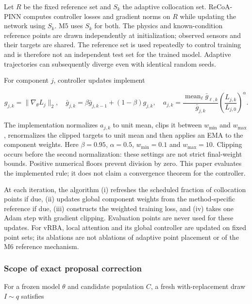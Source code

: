 \documentclass[
  11pt,
]{article}
\begin{document}
Let \(R\) be the fixed reference set and \(S_k\) the adaptive
collocation set. ReCoA-PINN computes controller losses and gradient
norms on \(R\) while updating the network using \(S_k\). M5 uses \(S_k\)
for both. The physics and known-condition reference points are drawn
independently at initialization; observed sensors and their targets are
shared. The reference set is used repeatedly to control training and is
therefore not an independent test set for the trained model. Adaptive
trajectories can subsequently diverge even with identical random seeds.

For component \(j\), controller updates implement

\begin{equation}
g_{j,k}=\|\nabla_\theta L_j\|_2,\quad
\bar g_{j,k}=\beta\bar g_{j,k-1}+(1-\beta)g_{j,k},\quad
a_{j,k}=\frac{\operatorname{mean}_\ell\bar g_{\ell,k}}{\bar g_{j,k}}
\left(\frac{L_{j,k}}{L_{j,0}}\right)^\alpha.
\end{equation}

The implementation normalizes \(a_{j,k}\) to unit mean, clips it between
\(w_{\min}\) and \(w_{\max}\), renormalizes the clipped targets to unit
mean and then applies an EMA to the component weights. Here
\(\beta=0.95\), \(\alpha=0.5\), \(w_{\min}=0.1\) and \(w_{\max}=10\).
Clipping occurs before the second normalization: these settings are not
strict final-weight bounds. Positive numerical floors prevent division
by zero. This paper evaluates the implemented rule; it does not claim a
convergence theorem for the controller.

At each iteration, the algorithm (i) refreshes the scheduled fraction of
collocation points if due, (ii) updates global component weights from
the method-specific reference if due, (iii) constructs the weighted
training loss, and (iv) takes one Adam step with gradient clipping.
Evaluation points are never used for these updates. For vRBA, local
attention and its global controller are updated on fixed point sets; its
ablations are not ablations of adaptive point placement or of the M6
reference mechanism.

\hypertarget{scope-of-exact-proposal-correction}{%
\subsubsection{Scope of exact proposal
correction}\label{scope-of-exact-proposal-correction}}

For a frozen model \(\theta\) and candidate population \(C\), a fresh
with-replacement draw \(I\sim q\) satisfies
\end{document}
